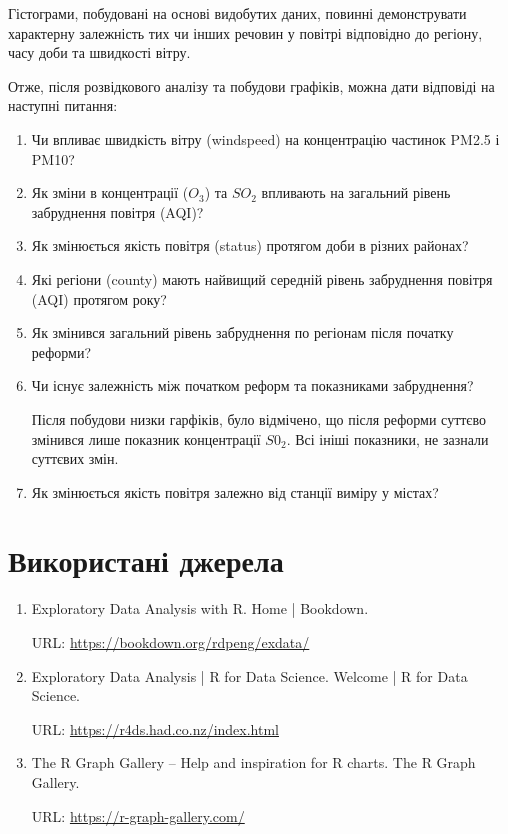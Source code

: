 \documentclass{article}
\begin{document}


Гістограми, побудовані на основі видобутих даних, повинні демонструвати характерну залежність тих чи інших речовин у повітрі відповідно до регіону, часу доби та швидкості вітру.

Отже, після розвідкового аналізу та побудови графіків, можна дати відповіді на наступні питання:
\begin{enumerate}
    \item Чи впливає швидкість вітру (windspeed) на концентрацію частинок PM2.5 і PM10?
    
    \item Як зміни в концентрації  ($O_3$)  та $SO_2$ впливають на загальний рівень забруднення повітря (AQI)?
    
    \item Як змінюється якість повітря (status) протягом доби в різних районах?
    
    \item Які регіони (county) мають найвищий середній рівень забруднення повітря (AQI) протягом року?
     
    \item Як змінився загальний рівень забруднення по регіонам після початку реформи?
    
    \item Чи існує залежність між початком реформ та показниками забруднення?
    
    Після побудови низки гарфіків, було відмічено, що після реформи суттєво змінився лише показник концентрації $S0_2$. Всі ініші показники, не зазнали суттєвих змін.
    
    \item Як змінюється якість повітря залежно від станції виміру у містах?
    
\end{enumerate}


\newpage
\section{Використані джерела}
\begin{enumerate}
    \item Exploratory Data Analysis with R. Home | Bookdown. 
    
    URL:  \href{https://bookdown.org/rdpeng/exdata/}{https://bookdown.org/rdpeng/exdata/}
    
    \item Exploratory Data Analysis | R for Data Science. Welcome | R for Data Science.
    
    URL: \href{https://r4ds.had.co.nz/index.html}{https://r4ds.had.co.nz/index.html}
    \item The R Graph Gallery – Help and inspiration for R charts. The R Graph Gallery. 
    
    URL: \href{ https://r-graph-gallery.com/}{ https://r-graph-gallery.com/ }
\end{enumerate}
\end{document}

